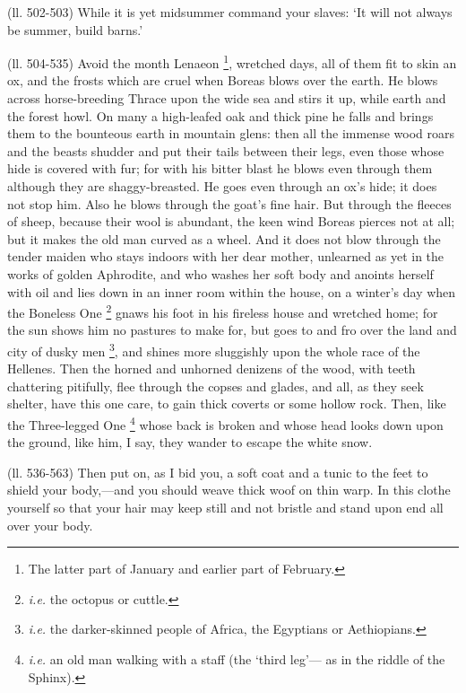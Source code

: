 (ll. 502-503) While it is yet midsummer command your slaves: ‘It will not
always be summer, build barns.’

(ll. 504-535) Avoid the month Lenaeon \footnote{The latter part of January
and earlier part of February.}, wretched
days, all of them fit to skin an ox, and the frosts which are cruel when Boreas
blows over the earth. He blows across horse-breeding Thrace upon the wide sea
and stirs it up, while earth and the forest howl. On many a high-leafed oak and
thick pine he falls and brings them to the bounteous earth in mountain glens:
then all the immense wood roars and the beasts shudder and put their tails
between their legs, even those whose hide is covered with fur; for with his
bitter blast he blows even through them although they are shaggy-breasted. He
goes even through an ox’s hide; it does not stop him. Also he blows
through the goat’s fine hair. But through the fleeces of sheep, because
their wool is abundant, the keen wind Boreas pierces not at all; but it makes
the old man curved as a wheel. And it does not blow through the tender maiden
who stays indoors with her dear mother, unlearned as yet in the works of golden
Aphrodite, and who washes her soft body and anoints herself with oil and lies
down in an inner room within the house, on a winter’s day when the
Boneless One \footnote{\emph{i.e.} the octopus or
cuttle.} gnaws his foot in his fireless
house and wretched home; for the sun shows him no pastures to make for, but
goes to and fro over the land and city of dusky men \footnote{\emph{i.e.} the
darker-skinned people of Africa, the Egyptians or Aethiopians.}, and
shines more sluggishly upon the whole race of the Hellenes. Then the horned and
unhorned denizens of the wood, with teeth chattering pitifully, flee through
the copses and glades, and all, as they seek shelter, have this one care, to
gain thick coverts or some hollow rock. Then, like the Three-legged One \footnote{\emph{i.e.} an old man
walking with a staff (the ‘third leg’— as in the riddle of
the Sphinx).} whose back is broken and whose
head looks down upon the ground, like him, I say, they wander to escape the
white snow.

(ll. 536-563) Then put on, as I bid you, a soft coat and a tunic to the feet to
shield your body,—and you should weave thick woof on thin warp. In this
clothe yourself so that your hair may keep still and not bristle and stand upon
end all over your body.

